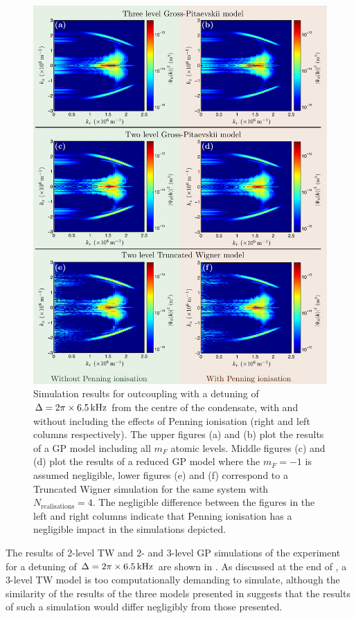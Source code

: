 \begin{figure}
    \centering
    \includegraphics[width=14cm]{DetunedOutcouplingModelComparison}
    \caption{Simulation results for outcoupling with a detuning of $\Delta = 2\pi \times \unit[6.5]{kHz}$ from the centre of the condensate, with and without including the effects of Penning ionisation (right and left columns respectively). The upper figures (a) and (b) plot the results of a GP model including all $m_F$ atomic levels. Middle figures (c) and (d) plot the results of a reduced GP model where the $m_F=-1$ is assumed negligible, lower figures (e) and (f) correspond to a Truncated Wigner simulation for the same system with $N_\text{realisations} = 4$. The negligible difference between the figures in the left and right columns indicate that Penning ionisation has a negligible impact in the simulations depicted.\label{Peaks:TheoryMaxFluxDetuningResults}}
\end{figure}

The results of 2-level TW and 2- and 3-level GP simulations of the experiment for a detuning of $\Delta = 2\pi \times \unit[6.5]{kHz}$ are shown in . As discussed at the end of , a 3-level TW model is too computationally demanding to simulate, although the similarity of the results of the three models presented in  suggests that the results of such a simulation would differ negligibly from those presented.

